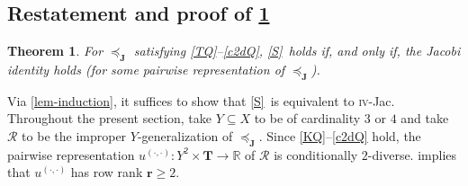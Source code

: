 \documentclass[ecta,nameyear,draft]{econsocart}
\newcommand{\R}{\mathbb R}
\newcommand{\mc}{\mathcal}
\newcommand{\ext}{\mathrel{\mc R}}
\newcommand{\mbbt}{{\mathbf {T}}}
\newcommand{\mbbj}{\mathbf J}
\newcommand{\dd}{{(\cdot,\cdot)}}
\newcommand{\stability}{\ref{S}}
\newcommand{\fourjac}{\textup{\textsc{iv}-Jac}}
\theoremstyle{plain}
\newtheorem{theorem}{Theorem}%
\theoremstyle{remark}
\begin{document}
\begin{appendix}
  \section{Restatement and proof of \cref{thm-foureq}}\label{sec-proof-foureq}
  \setcounter{theorem}{2}
  \begin{theorem}\label{thm-foureq} For $\preceq_{\mbbj}$ satisfying
    \ref{TQ}--\ref{c2dQ}, \stability\ holds if, and only if, the Jacobi
    identity holds (for some pairwise representation of $\preceq_{\mbbj}$).
  \end{theorem}
  Via \cref{lem-induction}, it suffices to show that \stability\ is equivalent
  to \fourjac. Throughout the present section, take $Y\subseteq X$ to be of
  cardinality $3$ or $4$ and take $\ext$ to be the improper
  $Y$-generalization of $\preceq_{\mbbj}$. Since
  \ref{KQ}--\ref{c2dQ} hold, the pairwise representation $u^{\dd}: Y^{2}\times
  \mbbt \rightarrow \R$ of $\ext$ is conditionally $2$-diverse. 
   implies that $u^{\dd}$ has row rank $\mathbf r \geq 2$.


\end{appendix}
\end{document}
